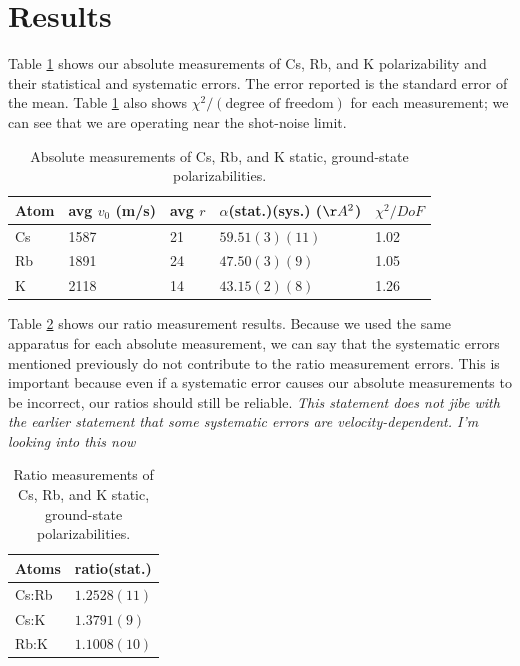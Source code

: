 \documentclass[twocolumn,prl,showpacs,superscriptaddress]{revtex4-1}   %
\newcommand{\polK}{43.15(2)(8)}
\newcommand{\polRb}{47.50(3)(9)}
\newcommand{\polCs}{59.51(3)(11)}
\newcommand{\ratRbK}{1.1008(10)}
\newcommand{\ratCsK}{1.3791(9)}
\newcommand{\ratCsRb}{1.2528(11)}
\begin{document}
\section{Results}

Table \ref{tableAbs} shows our absolute measurements of Cs, Rb, and K polarizability and their statistical and systematic errors. The error reported is the standard error of the mean. Table \ref{tableAbs} also shows $\chi^2/(\text{degree of freedom})$ for each measurement; we can see that we are operating near the shot-noise limit. 

\begingroup
\begin{table}
\caption{\label{tableAbs}Absolute measurements of Cs, Rb, and K static, ground-state polarizabilities.}
\begin{center}
\begin{tabular}{l l l l l}
\hline\hline
Atom & avg $v_0$ (m/s) & avg $r$ & $\alpha$(stat.)(sys.) ($\AA^2$) & $\chi^2/DoF$ \\
\hline
Cs & 1587 & 21 & $\polCs$ & 1.02 \\
Rb & 1891 & 24 & $\polRb$ & 1.05 \\
K  & 2118 & 14 & $\polK$ & 1.26 \\
\hline\hline
\end{tabular}
\end{center}
\end{table}
\endgroup

Table \ref{tableRatio} shows our ratio measurement results. Because we used the same apparatus for each absolute measurement, we can say that the systematic errors mentioned previously do not contribute to the ratio measurement errors. This is important because even if a systematic error causes our absolute measurements to be incorrect, our ratios should still be reliable. \textit{This statement does not jibe with the earlier statement that some systematic errors are velocity-dependent. I'm looking into this now} 

\begingroup
\begin{table}
\caption{\label{tableRatio}Ratio measurements of Cs, Rb, and K static, ground-state polarizabilities.}
\begin{center}
\begin{tabular}{l l}
\hline\hline
Atoms & ratio(stat.) \\
\hline
Cs:Rb & $\ratCsRb$ \\
Cs:K  & $\ratCsK$ \\
Rb:K  & $\ratRbK$ \\
\hline\hline
\end{tabular}
\end{center}
\end{table}
\endgroup
\end{document}
